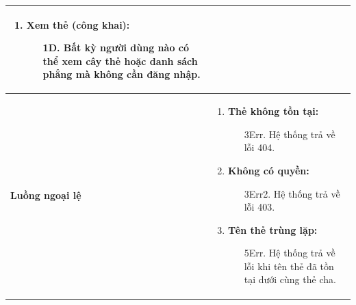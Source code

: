 {\begin{tabularx}{\textwidth}{|>{\raggedright\arraybackslash}X|>{\raggedright\arraybackslash}X|}
\begin{enumerate}
\begin{enumerate}
    \end{enumerate}
    \item \textbf{Xem thẻ (công khai):}
    \begin{enumerate}
        \item[1D.] Bất kỳ người dùng nào có thể xem cây thẻ hoặc danh sách phẳng mà không cần đăng nhập.
    \end{enumerate}
\end{enumerate} \\
\hline
\textbf{Luồng ngoại lệ} &
\begin{enumerate}
    \item \textbf{Thẻ không tồn tại:}
    \begin{enumerate}
        \item[3Err.] Hệ thống trả về lỗi 404.
    \end{enumerate}
    \item \textbf{Không có quyền:}
    \begin{enumerate}
        \item[3Err2.] Hệ thống trả về lỗi 403.
    \end{enumerate}
    \item \textbf{Tên thẻ trùng lặp:}
    \begin{enumerate}
        \item[5Err.] Hệ thống trả về lỗi khi tên thẻ đã tồn tại dưới cùng thẻ cha.
    \end{enumerate}
\end{enumerate} \\
\hline
\end{tabularx}
}

